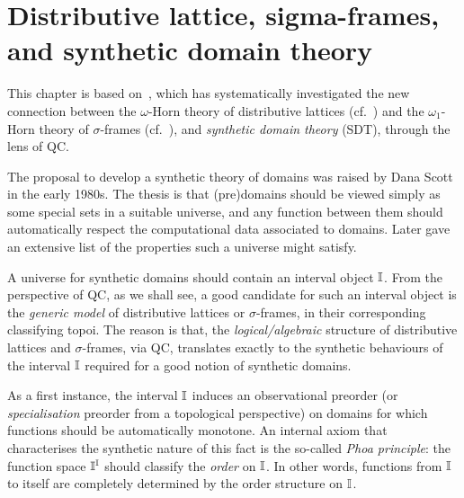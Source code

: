 \NewDocumentCommand{}
\NewDocumentCommand{}

\NewDocumentCommand{}
\NewDocumentCommand{}

\chapter{Distributive lattice, sigma-frames, and synthetic domain theory}\label{ch:domain}

This chapter is based on~\citet{sterling2025domains}, which has systematically investigated the new connection between the $\omega$-Horn theory of distributive lattices (cf.~) and the $\omega_1$-Horn theory of $\sigma$-frames (cf.~), and \emph{synthetic domain theory} (\gls{SDT}), through the lens of \gls{QC}.

The proposal to develop a synthetic theory of domains was raised by Dana Scott in the early 1980s. The thesis is that (pre)domains should be viewed simply as some special sets in a suitable universe, and any function between them should automatically respect the computational data associated to domains. Later \citet{hyland_first_2006} gave an extensive list of the properties such a universe might satisfy.

A universe for synthetic domains should contain an interval object $\mathbb{I}$. From the perspective of \gls{QC}, as we shall see, a good candidate for such an interval object is the \emph{generic model} of distributive lattices or $\sigma$-frames, in their corresponding classifying topoi. The reason is that, the \emph{logical/algebraic} structure of distributive lattices and $\sigma$-frames, via \gls{QC}, translates exactly to the synthetic behaviours of the interval $\mathbb{I}$ required for a good notion of synthetic domains. 

As a first instance, the interval $\mathbb{I}$ induces an observational preorder (or \emph{specialisation} preorder from a topological perspective) on domains for which functions should be automatically monotone. An internal axiom that characterises the synthetic nature of this fact is the so-called \emph{Phoa principle}: the function space $\mathbb{I}^{\mathbb{I}}$ should classify the \emph{order} on $\mathbb{I}$. In other words, functions from $\mathbb{I}$ to itself are completely determined by the order structure on $\mathbb{I}$. 

